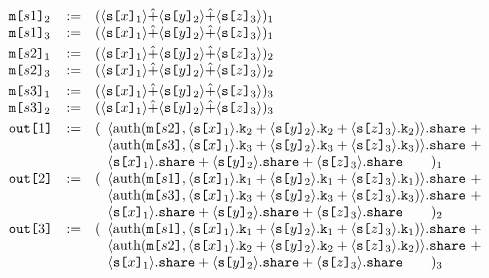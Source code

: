 $$
\begin{array}{lll}
  \texttt{m[}s1\texttt{]}_{2} &:=&
  (\langle \texttt{s[}x\texttt{]}_{1} \rangle\hat{+}\langle \texttt{s[}y\texttt{]}_{2} \rangle
    \hat{+}\langle \texttt{s[}z\texttt{]}_{3} \rangle)_{1}\\
  \texttt{m[}s1\texttt{]}_{3} &:=&
  (\langle \texttt{s[}x\texttt{]}_{1} \rangle\hat{+}\langle \texttt{s[}y\texttt{]}_{2} \rangle
    \hat{+}\langle \texttt{s[}z\texttt{]}_{3} \rangle)_{1}\\[1mm]
  \texttt{m[}s2\texttt{]}_{1} &:=&
  (\langle \texttt{s[}x\texttt{]}_{1} \rangle\hat{+}\langle \texttt{s[}y\texttt{]}_{2} \rangle
    \hat{+}\langle \texttt{s[}z\texttt{]}_{3} \rangle)_{2}\\
  \texttt{m[}s2\texttt{]}_{3} &:=&
  (\langle \texttt{s[}x\texttt{]}_{1} \rangle\hat{+}\langle \texttt{s[}y\texttt{]}_{2} \rangle
    \hat{+}\langle \texttt{s[}z\texttt{]}_{3} \rangle)_{2}\\[1mm]
  \texttt{m[}s3\texttt{]}_{1} &:=&
  (\langle \texttt{s[}x\texttt{]}_{1} \rangle\hat{+}\langle \texttt{s[}y\texttt{]}_{2} \rangle
    \hat{+}\langle \texttt{s[}z\texttt{]}_{3} \rangle)_{3}\\
  \texttt{m[}s3\texttt{]}_{2} &:=&
  (\langle \texttt{s[}x\texttt{]}_{1} \rangle\hat{+}\langle \texttt{s[}y\texttt{]}_{2} \rangle
    \hat{+}\langle \texttt{s[}z\texttt{]}_{3} \rangle)_{3}\\[1mm]
  \texttt{out[}1\texttt{]} &:=&(
  \begin{array}[t]{l}
  \langle \mathrm{auth}(\texttt{m[}s2\texttt{]},\langle \texttt{s[}x\texttt{]}_{1} \rangle.\texttt{k}_{2}+\langle \texttt{s[}y\texttt{]}_{2} \rangle.\texttt{k}_{2}
    +\langle \texttt{s[}z\texttt{]}_{3} \rangle.\texttt{k}_{2}) \rangle.\texttt{share}\ +\\
  \langle \mathrm{auth}(\texttt{m[}s3\texttt{]},\langle \texttt{s[}x\texttt{]}_{1} \rangle.\texttt{k}_{3}+\langle \texttt{s[}y\texttt{]}_{2} \rangle.\texttt{k}_{3}
    +\langle \texttt{s[}z\texttt{]}_{3} \rangle.\texttt{k}_{3}) \rangle.\texttt{share}\ +\\
  \langle \texttt{s[}x\texttt{]}_{1} \rangle.\texttt{share}+ \langle \texttt{s[}y\texttt{]}_{2} \rangle.\texttt{share}
    + \langle \texttt{s[}z\texttt{]}_{3} \rangle.\texttt{share}\qquad )_1
  \end{array}\\
  \texttt{out[}2\texttt{]} &:=&(
  \begin{array}[t]{l}
  \langle \mathrm{auth}(\texttt{m[}s1\texttt{]},\langle \texttt{s[}x\texttt{]}_{1} \rangle.\texttt{k}_{1}+\langle \texttt{s[}y\texttt{]}_{2} \rangle.\texttt{k}_{1}
    +\langle \texttt{s[}z\texttt{]}_{3} \rangle.\texttt{k}_{1}) \rangle.\texttt{share}\ +\\
  \langle \mathrm{auth}(\texttt{m[}s3\texttt{]},\langle \texttt{s[}x\texttt{]}_{1} \rangle.\texttt{k}_{3}+\langle \texttt{s[}y\texttt{]}_{2} \rangle.\texttt{k}_{3}
    +\langle \texttt{s[}z\texttt{]}_{3} \rangle.\texttt{k}_{3}) \rangle.\texttt{share}\ +\\
  \langle \texttt{s[}x\texttt{]}_{1} \rangle.\texttt{share}+ \langle \texttt{s[}y\texttt{]}_{2} \rangle.\texttt{share}
    + \langle \texttt{s[}z\texttt{]}_{3} \rangle.\texttt{share}\qquad )_2
  \end{array}\\
  \texttt{out[}3\texttt{]} &:=&(
  \begin{array}[t]{l}
  \langle \mathrm{auth}(\texttt{m[}s1\texttt{]},\langle \texttt{s[}x\texttt{]}_{1} \rangle.\texttt{k}_{1}+\langle \texttt{s[}y\texttt{]}_{2} \rangle.\texttt{k}_{1}
    +\langle \texttt{s[}z\texttt{]}_{3} \rangle.\texttt{k}_{1}) \rangle.\texttt{share}\ +\\
  \langle \mathrm{auth}(\texttt{m[}s2\texttt{]},\langle \texttt{s[}x\texttt{]}_{1} \rangle.\texttt{k}_{2}+\langle \texttt{s[}y\texttt{]}_{2} \rangle.\texttt{k}_{2}
    +\langle \texttt{s[}z\texttt{]}_{3} \rangle.\texttt{k}_{2}) \rangle.\texttt{share}\ +\\
  \langle \texttt{s[}x\texttt{]}_{1} \rangle.\texttt{share}+ \langle \texttt{s[}y\texttt{]}_{2} \rangle.\texttt{share}
    + \langle \texttt{s[}z\texttt{]}_{3} \rangle.\texttt{share}\qquad )_3
  \end{array}\\
\end{array}
$$


